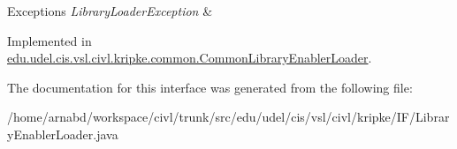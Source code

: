 \begin{DoxyExceptions}{Exceptions}
{\em Library\+Loader\+Exception} & \\
\hline
\end{DoxyExceptions}


Implemented in \hyperlink{classedu_1_1udel_1_1cis_1_1vsl_1_1civl_1_1kripke_1_1common_1_1CommonLibraryEnablerLoader_af495f1de8896b287b64145cda5dc6eb3}{edu.\+udel.\+cis.\+vsl.\+civl.\+kripke.\+common.\+Common\+Library\+Enabler\+Loader}.



The documentation for this interface was generated from the following file\+:\begin{DoxyCompactItemize}
\item 
/home/arnabd/workspace/civl/trunk/src/edu/udel/cis/vsl/civl/kripke/\+I\+F/Library\+Enabler\+Loader.\+java\end{DoxyCompactItemize}
